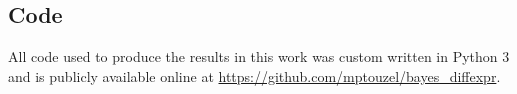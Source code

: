 \subsection*{Code}
All code used to produce the results in this work was custom written in Python 3 and is publicly available online at \url{https://github.com/mptouzel/bayes_diffexpr}.


 
  


